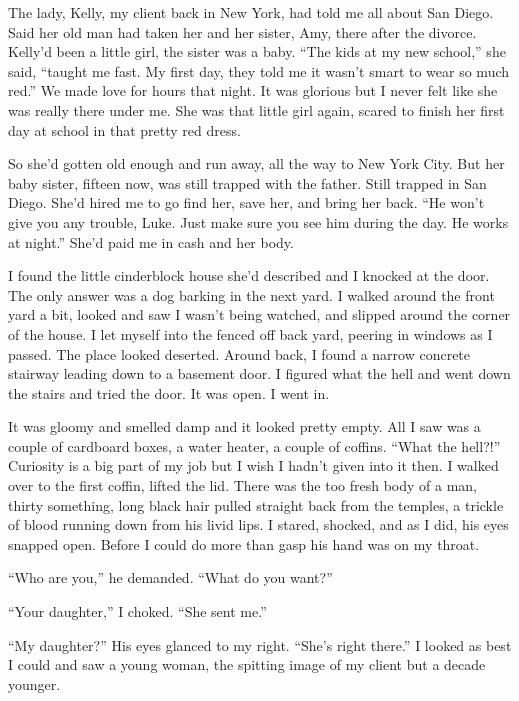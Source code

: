 The lady, Kelly, my client back in New York, had told me all about
San Diego. Said her old man had taken her and her sister, Amy,
there after the divorce. Kelly'd been a little girl, the
sister was a baby. ``The kids at my new school,'' she
said, ``taught me fast. My first day, they told me it
wasn't smart to wear so much red.'' We made love for
hours that night. It was glorious but I never felt like she was
really there under me. She was that little girl again, scared to
finish her first day at school in that pretty red dress.



So she'd gotten old enough and run away, all the way to New
York City. But her baby sister, fifteen now, was still trapped with
the father. Still trapped in San Diego. She'd hired me to go
find her, save her, and bring her back. ``He won't give
you any trouble, Luke. Just make sure you see him during the day.
He works at night.'' She'd paid me in cash and her
body.



I found the little cinderblock house she'd described and I
knocked at the door. The only answer was a dog barking in the next
yard. I walked around the front yard a bit, looked and saw I
wasn't being watched, and slipped around the corner of the
house. I let myself into the fenced off back yard, peering in
windows as I passed. The place looked deserted. Around back, I
found a narrow concrete stairway leading down to a basement door. I
figured what the hell and went down the stairs and tried the door.
It was open. I went in.



It was gloomy and smelled damp and it looked pretty empty. All I
saw was a couple of cardboard boxes, a water heater, a couple of
coffins. ``What the hell?!'' Curiosity is a big part of
my job but I wish I hadn't given into it then. I walked over
to the first coffin, lifted the lid. There was the too fresh body
of a man, thirty something, long black hair pulled straight back
from the temples, a trickle of blood running down from his livid
lips. I stared, shocked, and as I did, his eyes snapped open.
Before I could do more than gasp his hand was on my throat.



``Who are you,'' he demanded. ``What do you
want?''



``Your daughter,'' I choked. ``She sent
me.''



``My daughter?'' His eyes glanced to my right.
``She's right there.'' I looked as best I could and
saw a young woman, the spitting image of my client but a decade
younger.



